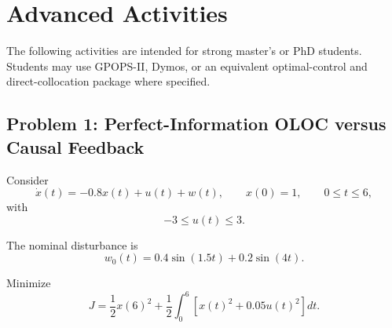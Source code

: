 
\section{Advanced Activities}

The following activities are intended for strong master's or PhD students.
Students may use GPOPS-II, Dymos, or an equivalent optimal-control and
direct-collocation package where specified.

\subsection*{Problem 1: Perfect-Information OLOC versus Causal Feedback}

Consider
\begin{equation}
\dot{x}(t)=-0.8x(t)+u(t)+w(t),
\qquad
x(0)=1,
\qquad
0\leq t\leq 6,
\end{equation}
with
\begin{equation}
-3\leq u(t)\leq 3.
\end{equation}

The nominal disturbance is
\begin{equation}
w_0(t)=0.4\sin(1.5t)+0.2\sin(4t).
\end{equation}

Minimize
\begin{equation}
J=
\frac{1}{2}x(6)^2
+
\frac{1}{2}
\int_0^6
\left[
x(t)^2+0.05u(t)^2
\right]dt.
\end{equation}

